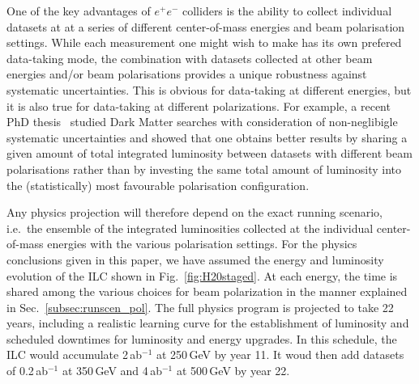

One of the key advantages of $e^+e^-$ colliders is the ability to collect individual datasets at at a series of different center-of-mass energies and beam polarisation settings.   While each measurement one might wish to make has its own prefered data-taking mode, the combination with datasets collected at other beam energies and/or beam polarisations provides a unique robustness against systematic uncertainties.  This is obvious for data-taking at different energies, but it is also
true for data-taking at different polarizations. For example, a recent PhD thesis~\cite{Habermehl:417605} studied Dark Matter searches with consideration of  non-neglibigle systematic uncertainties and showed that one obtains better results by  sharing a given amount of total integrated luminosity between datasets with different beam polarisations rather than by investing the same total amount of luminosity into the (statistically) most favourable polarisation configuration.

Any physics projection will therefore depend on the exact running scenario, i.e.\ the ensemble of the integrated luminosities collected at the individual center-of-mass energies with the various polarisation settings. For the physics conclusions given in this paper, we have assumed the energy and luminosity evolution of the ILC shown 
in Fig.~\ref{fig:H20staged}.  At each energy, the time is shared among the various choices for beam polarization in the manner explained in Sec.~\ref{subsec:runscen_pol}.
The full physics program is projected to take 22 years, including a realistic learning 
curve for the establishment of luminosity and scheduled downtimes for luminosity and energy upgrades.   In this schedule, the ILC would accumulate 2\,ab$^{-1}$ at 250\,GeV by year 11.  It woud then add datasets of 0.2\,ab$^{-1}$ at 350\,GeV and  4\,ab$^{-1}$ at 500\,GeV by year 22. 


